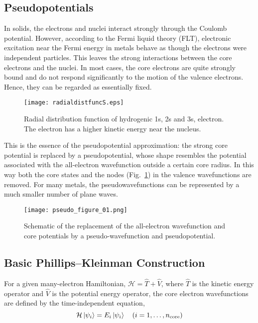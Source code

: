 \subsection{Pseudopotentials}
In solids, the electrons and nuclei interact strongly through the Coulomb potential. However, according to the Fermi liquid theory (FLT), electronic excitation near the Fermi energy in metals behave as though the electrons were independent particles. This leaves the strong interactions between the core electrons and the nuclei. In most cases, the core electrons are quite strongly bound and do not respond significantly to the motion of the valence electrons. Hence, they can be regarded as essentially fixed.
\begin{figure}
\centering
\texttt{[image: radialdistfuncS.eps]}
\caption[Radial distribution function of hydrogenic 1s, 2s, and 3s, electrons]{Radial distribution function of hydrogenic 1s, 2s and 3s, electron. The electron has a higher kinetic energy near the nucleus.}
\label{fig_hydrogen}
\end{figure}
This is the essence of the pseudopotential approximation: the strong core potential is replaced by a pseudopotential, whose shape resembles the potential associated with the all-electron wavefunction outside a certain core radius. In this way both the core states and the nodes (Fig.~\ref{fig_hydrogen}) in the valence wavefunctions are removed. For many metals, the pseudowavefunctions can be represented by a much smaller number of plane waves.
\begin{figure}
\centering
\texttt{[image: pseudo\_figure\_01.png]}
\caption{Schematic of the replacement of the all-electron wavefunction and core potentials by a pseudo-wavefunction and pseudopotential.}
\end{figure}
\subsection{Basic Phillips--Kleinman Construction}
For a given many-electron Hamiltonian, $\mathcal{H}=\hat{T}+\hat{V}$, where $\hat{T}$ is the kinetic energy operator and $\hat{V}$ is the potential energy operator, the core electron wavefunctions are defined by the time-independent \schrod equation,
\begin{equation}
 \mathcal{H}\ket{\psi_i} = E_i \ket{\psi_i} \quad   (i = 1,\dotsc, n_{\text{core}})
\end{equation}

